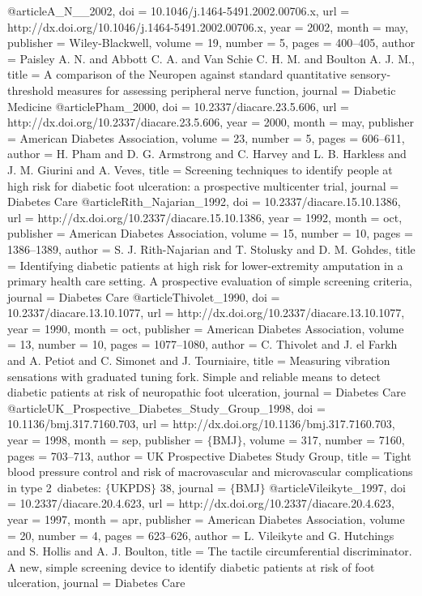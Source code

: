 @article{A_N__2002,
	doi = {10.1046/j.1464-5491.2002.00706.x},
	url = {http://dx.doi.org/10.1046/j.1464-5491.2002.00706.x},
	year = 2002,
	month = {may},
	publisher = {Wiley-Blackwell},
	volume = {19},
	number = {5},
	pages = {400--405},
	author = {Paisley A. N. and Abbott C. A. and Van Schie C. H. M. and Boulton A. J. M.},
	title = {A comparison of the Neuropen against standard quantitative sensory-threshold measures for assessing peripheral nerve function},
	journal = {Diabetic Medicine}
}
@article{Pham_2000,
	doi = {10.2337/diacare.23.5.606},
	url = {http://dx.doi.org/10.2337/diacare.23.5.606},
	year = 2000,
	month = {may},
	publisher = {American Diabetes Association},
	volume = {23},
	number = {5},
	pages = {606--611},
	author = {H. Pham and D. G. Armstrong and C. Harvey and L. B. Harkless and J. M. Giurini and A. Veves},
	title = {Screening techniques to identify people at high risk for diabetic foot ulceration: a prospective multicenter trial},
	journal = {Diabetes Care}
}
@article{Rith_Najarian_1992,
	doi = {10.2337/diacare.15.10.1386},
	url = {http://dx.doi.org/10.2337/diacare.15.10.1386},
	year = 1992,
	month = {oct},
	publisher = {American Diabetes Association},
	volume = {15},
	number = {10},
	pages = {1386--1389},
	author = {S. J. Rith-Najarian and T. Stolusky and D. M. Gohdes},
	title = {Identifying diabetic patients at high risk for lower-extremity amputation in a primary health care setting. A prospective evaluation of simple screening criteria},
	journal = {Diabetes Care}
}
@article{Thivolet_1990,
	doi = {10.2337/diacare.13.10.1077},
	url = {http://dx.doi.org/10.2337/diacare.13.10.1077},
	year = 1990,
	month = {oct},
	publisher = {American Diabetes Association},
	volume = {13},
	number = {10},
	pages = {1077--1080},
	author = {C. Thivolet and J. el Farkh and A. Petiot and C. Simonet and J. Tourniaire},
	title = {Measuring vibration sensations with graduated tuning fork. Simple and reliable means to detect diabetic patients at risk of neuropathic foot ulceration},
	journal = {Diabetes Care}
}
@article{UK_Prospective_Diabetes_Study_Group_1998,
	doi = {10.1136/bmj.317.7160.703},
	url = {http://dx.doi.org/10.1136/bmj.317.7160.703},
	year = 1998,
	month = {sep},
	publisher = {$\lbrace$BMJ$\rbrace$},
	volume = {317},
	number = {7160},
	pages = {703--713},
	author = {UK Prospective Diabetes Study Group},
	title = {Tight blood pressure control and risk of macrovascular and microvascular complications in type 2~diabetes: $\lbrace$UKPDS$\rbrace$ 38},
	journal = {$\lbrace$BMJ$\rbrace$}
}
@article{Vileikyte_1997,
	doi = {10.2337/diacare.20.4.623},
	url = {http://dx.doi.org/10.2337/diacare.20.4.623},
	year = 1997,
	month = {apr},
	publisher = {American Diabetes Association},
	volume = {20},
	number = {4},
	pages = {623--626},
	author = {L. Vileikyte and G. Hutchings and S. Hollis and A. J. Boulton},
	title = {The tactile circumferential discriminator. A new, simple screening device to identify diabetic patients at risk of foot ulceration},
	journal = {Diabetes Care}
}
